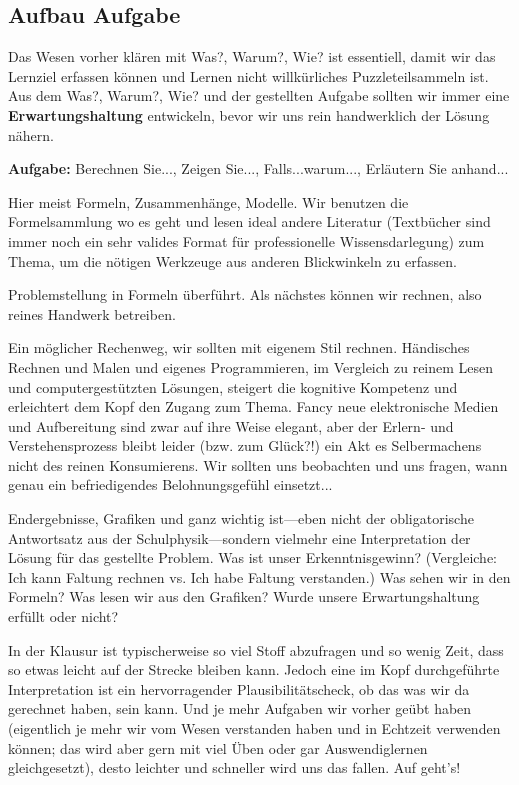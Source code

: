 \subsection*{Aufbau Aufgabe}
\begin{Ziel}
Das Wesen vorher klären mit Was?, Warum?, Wie? ist essentiell, damit wir das
Lernziel erfassen können und Lernen nicht willkürliches Puzzleteilsammeln ist.
Aus dem Was?, Warum?, Wie? und der gestellten Aufgabe sollten wir immer eine
\textbf{Erwartungshaltung} entwickeln, bevor wir uns rein handwerklich der Lösung nähern.
\end{Ziel}
\textbf{Aufgabe:} Berechnen Sie..., Zeigen Sie..., Falls...warum..., Erläutern
Sie anhand...
\begin{Werkzeug}
Hier meist Formeln, Zusammenhänge, Modelle. Wir benutzen die Formelsammlung
wo es geht und lesen ideal andere Literatur (Textbücher sind immer noch ein sehr
valides Format für professionelle Wissensdarlegung) zum Thema, um die nötigen
Werkzeuge aus anderen Blickwinkeln zu erfassen.
\end{Werkzeug}
\begin{Ansatz}
Problemstellung in Formeln überführt. Als nächstes können wir rechnen, also
reines Handwerk betreiben.
\end{Ansatz}
\begin{ExCalc}
Ein möglicher Rechenweg, wir sollten mit eigenem Stil
rechnen.
Händisches Rechnen und Malen und eigenes Programmieren, im Vergleich zu reinem
Lesen und computergestützten Lösungen, steigert die kognitive Kompetenz und
erleichtert dem Kopf den Zugang zum Thema.
%
Fancy neue elektronische Medien und Aufbereitung sind zwar auf ihre Weise elegant,
aber der Erlern- und Verstehensprozess bleibt leider (bzw. zum Glück?!) ein
Akt es Selbermachens nicht des reinen Konsumierens.
%
Wir sollten uns beobachten und uns fragen, wann genau ein
befriedigendes Belohnungsgefühl einsetzt...
%
\end{ExCalc}
\begin{Loesung}
Endergebnisse, Grafiken und ganz wichtig ist---eben nicht der obligatorische Antwortsatz
aus der Schulphysik---sondern vielmehr eine Interpretation der Lösung
für das gestellte Problem.
%
Was ist unser Erkenntnisgewinn?
%
(Vergleiche: Ich kann Faltung rechnen vs. Ich habe Faltung verstanden.)
%
Was sehen wir in den Formeln?
%
Was lesen wir aus den Grafiken?
%
Wurde unsere Erwartungshaltung erfüllt oder nicht?

In der Klausur ist typischerweise so viel Stoff abzufragen und so wenig Zeit,
dass so etwas leicht auf der Strecke bleiben kann. Jedoch eine im Kopf
durchgeführte Interpretation ist ein hervorragender Plausibilitätscheck, ob das was
wir da gerechnet haben, sein kann. Und je mehr Aufgaben wir
vorher geübt haben (eigentlich je mehr wir vom Wesen verstanden haben und in
Echtzeit verwenden können; das wird aber gern mit viel Üben oder gar
Auswendiglernen gleichgesetzt),
desto leichter und schneller wird uns das fallen.
%
Auf geht's!
\end{Loesung}

